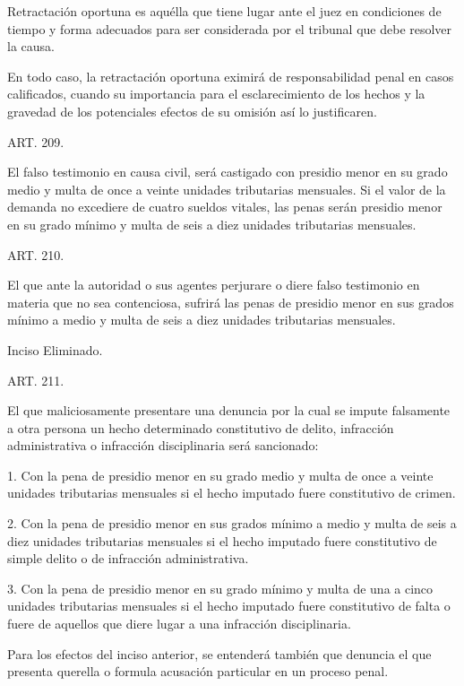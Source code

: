     Retractación oportuna es aquélla que tiene lugar ante el juez en condiciones de tiempo y forma adecuados para ser considerada por el tribunal que debe resolver la causa.

    En todo caso, la retractación oportuna eximirá de responsabilidad penal en casos calificados, cuando su importancia para el esclarecimiento de los hechos y la gravedad de los potenciales efectos de su omisión así lo justificaren.


    ART. 209.

    El falso testimonio en causa civil, será castigado con presidio menor en su grado medio y multa de once a veinte unidades tributarias mensuales.
    Si el valor de la demanda no excediere de cuatro sueldos vitales, las penas serán presidio menor en su grado mínimo y multa de seis a diez unidades tributarias mensuales.









    ART. 210.

    El que ante la autoridad o sus agentes perjurare o diere falso testimonio en materia que no sea contenciosa, sufrirá las penas de presidio menor en sus grados mínimo a medio y multa de seis a diez unidades tributarias mensuales.

    Inciso Eliminado.


    ART. 211.

    El que maliciosamente presentare una denuncia por la cual se impute falsamente a otra persona un hecho determinado constitutivo de delito, infracción administrativa o infracción disciplinaria será sancionado:
     
    1. Con la pena de presidio menor en su grado medio y multa de once a veinte unidades tributarias mensuales si el hecho imputado fuere constitutivo de crimen.
     
    2. Con la pena de presidio menor en sus grados mínimo a medio y multa de seis a diez unidades tributarias mensuales si el hecho imputado fuere constitutivo de simple delito o de infracción administrativa.
     
    3. Con la pena de presidio menor en su grado mínimo y multa de una a cinco unidades tributarias mensuales si el hecho imputado fuere constitutivo de falta o fuere de aquellos que diere lugar a una infracción disciplinaria.
     
    Para los efectos del inciso anterior, se entenderá también que denuncia el que presenta querella o formula acusación particular en un proceso penal.


